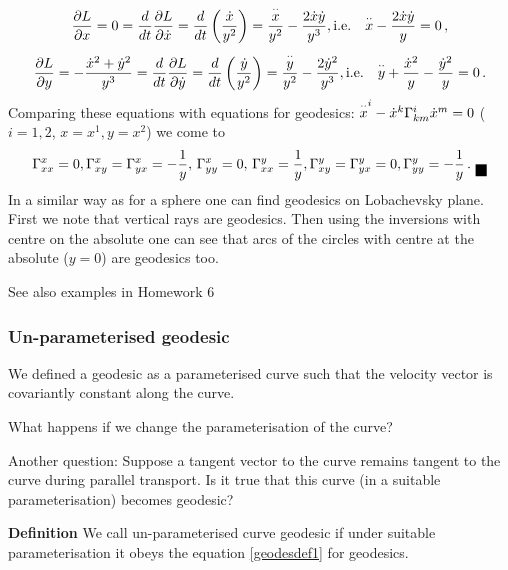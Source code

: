 \documentclass[12pt]{article}
\theoremstyle{theorem}
\numberwithin{equation}{section}
\begin{document}
{  $$
  {\p L\over \p x}=0={d\over dt}{\p L\over \p \dot x}={d\over dt}\left({\dot x\over y^2}\right)=
            {{\buildrel \cdot\cdot\over x}\over y^2}-{2\dot x\dot y\over y^3}, {\rm i.e.}\quad
            {\buildrel \cdot\cdot\over x}-{2\dot x\dot y\over y}=0\,,
             $$
             $$
              {\p L\over \p y}=-{\dot x^2+\dot y^2\over y^3}=
              {d\over dt}{\p L\over \p \dot y}={d\over dt}\left({\dot y\over y^2}\right)=
            {{\buildrel \cdot\cdot\over y}\over y^2}-{2\dot y^2\over y^3}, {\rm i.e.}\quad
            {\buildrel \cdot\cdot\over y}+{\dot x^2\over y}-{\dot y^2\over y}=0\,.
            $$
Comparing these equations with equations for geodesics:
${\buildrel \cdot\cdot\over x^i}-\dot x^k\Gamma^i_{km}\dot x^m=0$
($i=1,2$, $x=x^1,y=x^2$) we come to
                $$
\Gamma^{x}_{xx}=0,
\Gamma^{x}_{xy}=\Gamma^{x}_{yx}=-{1\over y},\,
\Gamma^{x}_{yy}=0,\,\Gamma^{y}_{xx}={1\over y}, \Gamma^{y}_{xy}=\Gamma^{y}_{yx}=0, \Gamma^{y}_{yy}=-{1\over y}\,.
              \hbox{\finish}  $$
{\footnotesize In  a similar way as for a sphere one can find geodesics on Lobachevsky plane.
First we note that vertical rays are geodesics.  Then using the inversions with centre on the absolute
one can see that arcs of the circles with centre at the absolute ($y=0$) are geodesics too.
}

See also examples in Homework 6 



\subsubsection {Un-parameterised geodesic}

We defined a geodesic as a parameterised curve such that the velocity vector
is covariantly constant along the curve.

\m

What happens if we change the parameterisation of the curve?


\m

  Another  question:  Suppose a tangent vector to the curve remains tangent to the curve during parallel transport.
  Is it true that this curve (in a suitable parameterisation) becomes geodesic?

\m

 {\bf Definition}  We call un-parameterised curve geodesic 
if under suitable parameterisation it obeys
   the equation \eqref{geodesdef1} for geodesics.

}
\end{document}
